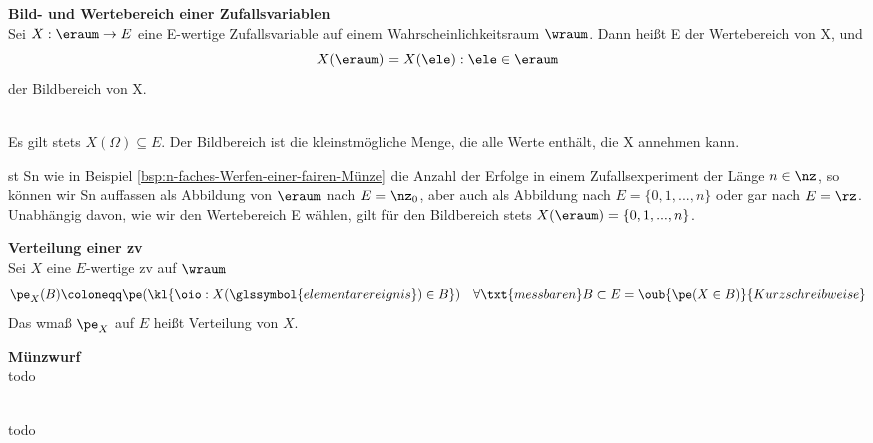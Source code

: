 \begin{defi}
    \textbf{Bild- und Wertebereich einer Zufallsvariablen}   \\
    Sei $X : \eraum \rightarrow E$ eine E-wertige Zufallsvariable auf einem Wahrscheinlichkeitsraum $\wraum$. Dann
    heißt E der Wertebereich von X, und
\[
    X(\eraum) = {X(\ele) : \ele \in \eraum}
\]
    der Bildbereich von X.
\end{defi}

\begin{bem}     \\
Es gilt stets $X(Ω) ⊆ E$. Der Bildbereich ist die kleinstmögliche Menge, die alle Werte enthält,
die X annehmen kann.

st Sn wie in Beispiel \autoref{bsp:n-faches-Werfen-einer-fairen-Münze} die Anzahl der Erfolge in einem
Zufallsexperiment der Länge $n \in \nz$,
so können wir Sn auffassen als Abbildung von $\eraum$ nach $E = \nz_0$, aber auch als Abbildung
nach $E = \{0, 1, . . . , n\}$ oder gar nach $E = \rz$. Unabhängig davon, wie wir den Wertebereich E
wählen, gilt für den Bildbereich stets $X(\eraum) = \{0, 1, . . . , n\}$.
\end{bem}


\begin{defi}
    \label{def:verteilung-zv}
    \textbf{Verteilung einer \gls{zv}}   \\
    Sei $X$ eine $E$-wertige \gls{zv} auf $\wraum$
    \[
        \pe_X(B) \coloneqq  \pe(\kl{\oio : X(\glssymbol{elementarereignis}) \in B}) \quad \forall \txt{messbaren } B \subset E = \oub{\pe(X \in B)}{Kurzschreibweise}
    \]
    Das \gls{wmaß} $\pe_X$ auf $E$ heißt Verteilung von $X$.
\end{defi}

\begin{bsp} \textbf{Münzwurf}   \\
    todo
\end{bsp}

\begin{bem}    \\
   todo  %
\end{bem}

